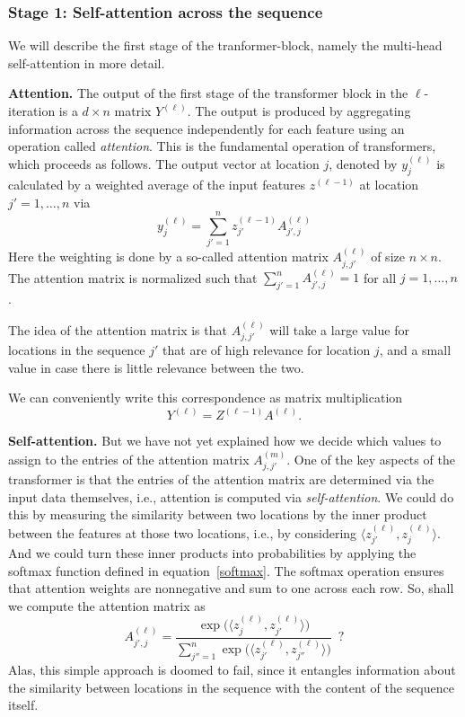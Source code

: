 \subsubsection{Stage 1: Self-attention across the sequence}

We will describe the first stage of the tranformer-block, namely the multi-head self-attention in more detail.


\smallskip
\noindent
\textbf{Attention.}
The output of the first stage of the transformer block in the $\ell$-iteration is a $d \times n$ matrix $Y^{(\ell)}$. The output is produced by aggregating information across the sequence
independently for each feature using an operation called {\em attention}. 
This is the fundamental operation of transformers, which proceeds as follows. The output vector at location $j$, denoted by $y^{(\ell)}_j$ is calculated
by a weighted average of the input features $z^{(\ell-1)}$ at location $j' = 1,\dots,n$ via
\begin{equation}\label{eq:trans1}
y_j^{(\ell)} = \sum_{j'=1}^n  z_{j'}^{(\ell-1)} A_{j',j}^{(\ell)}  
\end{equation}
Here the weighting is done by a so-called attention matrix $A_{j,j'}^{(\ell)}$ of size $n \times n$. The attention matrix is normalized such that $\sum_{j'=1}^n  A_{j',j}^{(\ell)} = 1$ for all $j=1,\dots,n$. 

The idea of the attention matrix is that $A_{j,j'}^{(\ell)}$ will take a large value for locations in the sequence $j'$ that are of high relevance for location $j$, and a small value in case there is little relevance between the two.

We can conveniently write this correspondence
as matrix multiplication
$$Y^{(\ell)} = Z^{(\ell-1)}  A^{(\ell)}.$$

\noindent
\textbf{Self-attention.}
But we have not yet explained how we decide which values to assign to the entries of the attention matrix $A_{j,j'}^{(m)}$. One of the key aspects of the transformer is that the entries of the attention matrix are determined via the input data themselves, i.e., attention is computed via {\em self-attention}.
We could do this by measuring the similarity between two locations by the inner product between the
features at those two locations, i.e., by considering $\langle z_{j'}^{(\ell)}, z_{j}^{(\ell)} \rangle$. And we could turn these inner products into probabilities by applying the softmax function defined in equation~\eqref{softmax}. 
The softmax operation ensures that attention weights are nonnegative and sum to one across each row.
So, shall we compute the attention matrix as
$$
A_{j',j}^{(\ell)} = \frac{\exp\big(\langle z_{j}^{(\ell)}, z_{j'}^{(\ell)} \rangle\big)}{\sum_{j''=1}^n \exp\big(\langle z_{j'}^{(\ell)}, z_{j''}^{(\ell)} \rangle\big)} \,\,\, ?
$$
Alas, this simple approach is doomed to fail, since it entangles information about the similarity between
locations in the sequence with the content of the sequence itself.

